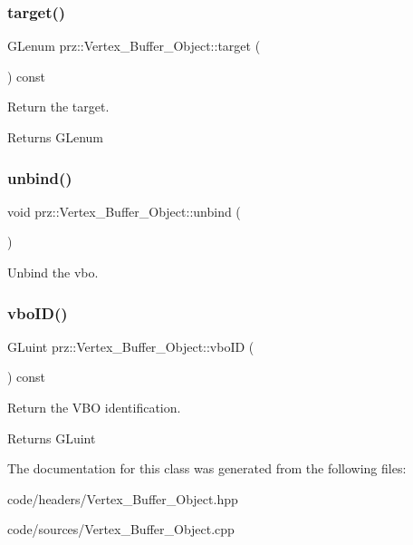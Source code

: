 \subsubsection{\texorpdfstring{target()}{target()}}
{\footnotesize\ttfamily G\+Lenum prz\+::\+Vertex\+\_\+\+Buffer\+\_\+\+Object\+::target (\begin{DoxyParamCaption}{ }\end{DoxyParamCaption}) const\hspace{0.3cm}{\ttfamily [inline]}}



Return the target. 

\begin{DoxyReturn}{Returns}
G\+Lenum 
\end{DoxyReturn}
\mbox{\label{classprz_1_1_vertex___buffer___object_ac0e62263c69190df824e94c318d178af}} 
\subsubsection{\texorpdfstring{unbind()}{unbind()}}
{\footnotesize\ttfamily void prz\+::\+Vertex\+\_\+\+Buffer\+\_\+\+Object\+::unbind (\begin{DoxyParamCaption}{ }\end{DoxyParamCaption})\hspace{0.3cm}{\ttfamily [inline]}}



Unbind the vbo. 

\mbox{\label{classprz_1_1_vertex___buffer___object_afa221de7c5ae0a1557a570c5d6b8a057}} 
\subsubsection{\texorpdfstring{vboID()}{vboID()}}
{\footnotesize\ttfamily G\+Luint prz\+::\+Vertex\+\_\+\+Buffer\+\_\+\+Object\+::vbo\+ID (\begin{DoxyParamCaption}{ }\end{DoxyParamCaption}) const\hspace{0.3cm}{\ttfamily [inline]}}



Return the V\+BO identification. 

\begin{DoxyReturn}{Returns}
G\+Luint 
\end{DoxyReturn}


The documentation for this class was generated from the following files\+:\begin{DoxyCompactItemize}
\item 
code/headers/Vertex\+\_\+\+Buffer\+\_\+\+Object.\+hpp\item 
code/sources/Vertex\+\_\+\+Buffer\+\_\+\+Object.\+cpp\end{DoxyCompactItemize}
